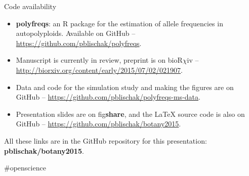 \documentclass[presentation]{beamer}
\begin{document}
\begin{frame}[t,plain]{Code availability}
	\fontsize{10pt}{10}\selectfont
	\begin{itemize}
		\item \textbf{polyfreqs}: an R package for the estimation of allele frequencies in autopolyploids. Available on GitHub -- \url{https://github.com/pblischak/polyfreqs}.
		\vspace{0.2in}
		
		\item Manuscript is currently in review, preprint is on bioR$\chi$iv -- \url{http://biorxiv.org/content/early/2015/07/02/021907}.
		\vspace{0.2in}
	
		\item Data and code for the simulation study and making the figures are on GitHub -- \url{https://github.com/pblischak/polyfreqs-ms-data}.
		\vspace{0.2in}
	
		\item Presentation slides are on fig\textbf{share}, and the \LaTeX{} source code is also on GitHub -- \url{https://github.com/pblischak/botany2015}.
	\end{itemize}
	\vspace{0.15in}
	
	{\Large \alert{All these links are in the GitHub repository for this presentation: \textbf{pblischak/botany2015}.}}
	
	\hfill {\tiny \#openscience}
\end{frame}
\end{document}
